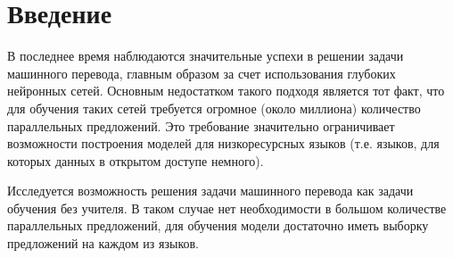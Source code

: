 \documentclass[12pt,twoside]{article}
\title
{Обучение машинного перевода без параллельных текстов}
\author
{Ямалутдинов~А.\,В.,  Стрижов~В.\,В., Бахтеев~О.\,Ю.} %
[Ямалутдинов~А.\,В.,  Стрижов~В.\,В., Бахтеев~О.\,Ю.$] %
\begin{document}
	
	\maketitle
	
	\section{Введение}
    В последнее время наблюдаются значительные успехи в решении задачи машинного перевода, главным образом за счет использования 
    глубоких нейронных сетей. Основным недостатком такого подходя является тот факт, что для обучения таких сетей требуется огромное
    (около миллиона) количество параллельных предложений. Это требование значительно ограничивает возможности построения моделей для
    низкоресурсных языков (т.е. языков, для которых данных в открытом доступе немного).

    Исследуется возможность решения задачи машинного перевода как задачи обучения без учителя. В таком случае нет необходимости в
    большом количестве параллельных предложений, для обучения модели достаточно иметь выборку предложений на каждом из языков. 
	
	
	
	
	
	
	
	
	
	
\end{document}
